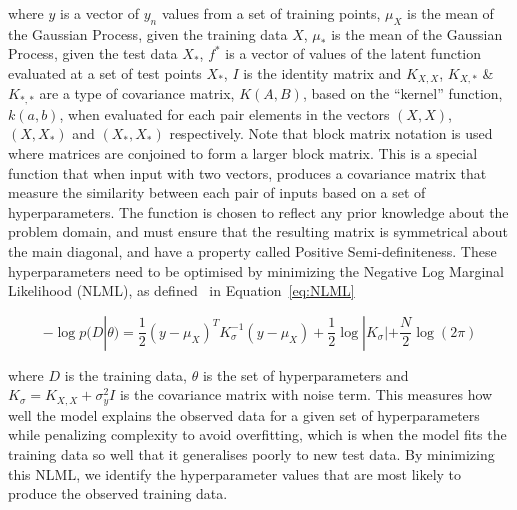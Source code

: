 \documentclass[12pt]{article}
\begin{document}
    where $y$ is a vector of $y_n$ values from a set of training points, $\mu_X$ is the mean of the Gaussian Process, given the training data $X$, $\mu_*$ is the mean of the Gaussian Process, given the test data $X_*$, $f^*$ is a vector of values of the latent function evaluated at a set of test points $X_*$, $I$ is the identity matrix and $K_{X,X}$, $K_{X,*}$ \& $K_{*,*}$ are a type of covariance matrix, $K(A,B)$, based on the ``kernel'' function, $k(a,b)$, when evaluated for each pair elements in the vectors $(X,X)$, $(X,X_*)$ and $(X_*,X_*)$ respectively.
    Note that block matrix notation is used where matrices are conjoined to form a larger block matrix. 
    This is a special function that when input with two vectors, produces a covariance matrix that measure the similarity between each pair of inputs based on a set of hyperparameters.
    The function is chosen to reflect any prior knowledge about the problem domain, and must ensure that the resulting matrix is symmetrical about the main diagonal, and have a property called Positive Semi-definiteness.
    These hyperparameters need to be optimised by minimizing the Negative Log Marginal Likelihood (NLML), as defined~\cite{murphy2023probabilistic} in Equation~\ref{eq:NLML}

    \begin{equation}
        -\log p(D|\theta) = \frac{1}{2} (y - \mu_X)^T K_{\sigma}^{-1} (y - \mu_X) + \frac{1}{2} \log |K_{\sigma}| + \frac{N}{2} \log(2\pi)\label{eq:NLML}
    \end{equation}


    where $D$ is the training data, $\theta$ is the set of hyperparameters and $K_{\sigma} = K_{X,X} + \sigma^2_y I$ is the covariance matrix with noise term.
    This measures how well the model explains the observed data for a given set of hyperparameters while penalizing complexity to avoid overfitting, which is when the model fits the training data so well that it generalises poorly to new test data.
    By minimizing this NLML, we identify the hyperparameter values that are most likely to produce the observed training data.
\end{document}
